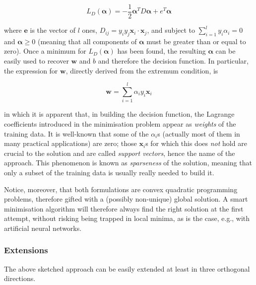 \documentclass[conference]{IEEEtran}
\def\xx{\mathbf{x}}
\def\ww{\mathbf{w}}
\def\aa{\boldsymbol{\alpha}}
\def\ee{\mathbf{e}}
\begin{document}
$$ L_D(\aa) = -\frac{1}{2} \aa^T D \aa + e^T \aa $$

\noindent where $\ee$ is the vector of $l$ ones,
$D_{ij}=y_iy_j\xx_i\cdot\xx_j$, and subject to $\sum_{i=1}^{l}
y_i\alpha_i = 0$ and $\aa \geq 0$ (meaning that all components of
$\aa$ must be greater than or equal to zero). Once a minimum for
$L_D(\aa)$ has been found, the resulting $\aa$ can be easily used to
recover $\ww$ and $b$ and therefore the decision function. In
particular, the expression for $\ww$, directly derived from the
extremum condition, is

$$ \ww = \sum_{i=1}^{l} \alpha_i y_i \xx_i $$

\noindent in which it is apparent that, in building the decision
function, the Lagrange coefficients introduced in the minimisation
problem appear as \emph{weights} of the training data. It is
well-known that some of the $\alpha_i$s (actually most of them in many
practical applications) are zero; those $\xx_i$s for which this does
\emph{not} hold are crucial to the solution and are called
\emph{support vectors}, hence the name of the approach. This
phenomenon is known as \emph{sparseness} of the solution, meaning that
only a subset of the training data is usually really needed to build
it.

Notice, moreover, that both formulations are convex quadratic
programming problems, therefore gifted with a (possibly non-unique)
global solution. A smart minimisation algorithm will therefore always
find the right solution at the first attempt, without risking being
trapped in local minima, as is the case, e.g., with artificial neural
networks.

\subsubsection{Extensions}

The above sketched approach can be easily extended at least in three
orthogonal directions.
\end{document}
